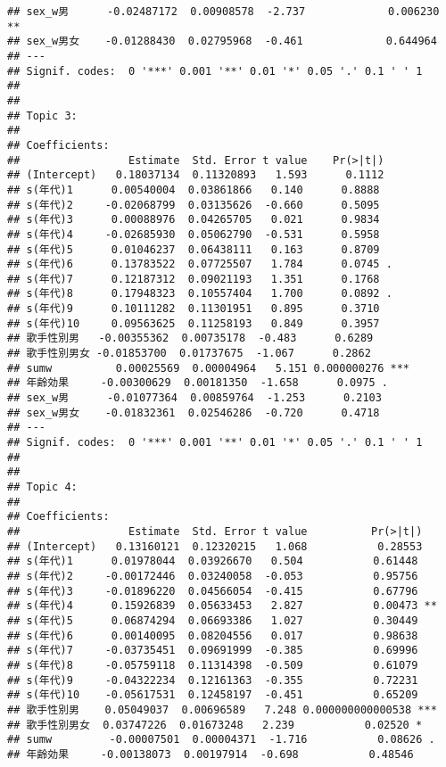 \documentclass[
]{article}
\begin{document}
\begin{verbatim}
## sex_w男      -0.02487172  0.00908578  -2.737             0.006230 ** 
## sex_w男女    -0.01288430  0.02795968  -0.461             0.644964    
## ---
## Signif. codes:  0 '***' 0.001 '**' 0.01 '*' 0.05 '.' 0.1 ' ' 1
## 
## 
## Topic 3:
## 
## Coefficients:
##                 Estimate  Std. Error t value    Pr(>|t|)    
## (Intercept)   0.18037134  0.11320893   1.593      0.1112    
## s(年代)1      0.00540004  0.03861866   0.140      0.8888    
## s(年代)2     -0.02068799  0.03135626  -0.660      0.5095    
## s(年代)3      0.00088976  0.04265705   0.021      0.9834    
## s(年代)4     -0.02685930  0.05062790  -0.531      0.5958    
## s(年代)5      0.01046237  0.06438111   0.163      0.8709    
## s(年代)6      0.13783522  0.07725507   1.784      0.0745 .  
## s(年代)7      0.12187312  0.09021193   1.351      0.1768    
## s(年代)8      0.17948323  0.10557404   1.700      0.0892 .  
## s(年代)9      0.10111282  0.11301951   0.895      0.3710    
## s(年代)10     0.09563625  0.11258193   0.849      0.3957    
## 歌手性別男   -0.00355362  0.00735178  -0.483      0.6289    
## 歌手性別男女 -0.01853700  0.01737675  -1.067      0.2862    
## sumw          0.00025569  0.00004964   5.151 0.000000276 ***
## 年齢効果     -0.00300629  0.00181350  -1.658      0.0975 .  
## sex_w男      -0.01077364  0.00859764  -1.253      0.2103    
## sex_w男女    -0.01832361  0.02546286  -0.720      0.4718    
## ---
## Signif. codes:  0 '***' 0.001 '**' 0.01 '*' 0.05 '.' 0.1 ' ' 1
## 
## 
## Topic 4:
## 
## Coefficients:
##                 Estimate  Std. Error t value          Pr(>|t|)    
## (Intercept)   0.13160121  0.12320215   1.068           0.28553    
## s(年代)1      0.01978044  0.03926670   0.504           0.61448    
## s(年代)2     -0.00172446  0.03240058  -0.053           0.95756    
## s(年代)3     -0.01896220  0.04566054  -0.415           0.67796    
## s(年代)4      0.15926839  0.05633453   2.827           0.00473 ** 
## s(年代)5      0.06874294  0.06693386   1.027           0.30449    
## s(年代)6      0.00140095  0.08204556   0.017           0.98638    
## s(年代)7     -0.03735451  0.09691999  -0.385           0.69996    
## s(年代)8     -0.05759118  0.11314398  -0.509           0.61079    
## s(年代)9     -0.04322234  0.12161363  -0.355           0.72231    
## s(年代)10    -0.05617531  0.12458197  -0.451           0.65209    
## 歌手性別男    0.05049037  0.00696589   7.248 0.000000000000538 ***
## 歌手性別男女  0.03747226  0.01673248   2.239           0.02520 *  
## sumw         -0.00007501  0.00004371  -1.716           0.08626 .  
## 年齢効果     -0.00138073  0.00197914  -0.698           0.48546    

\end{verbatim}
\end{document}
